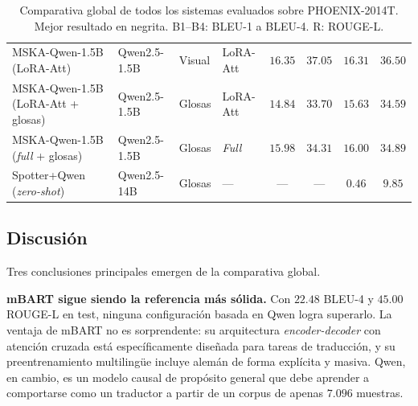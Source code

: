 \begin{table}[H]
{\begin{tabular}{llll|cc|cc}
		MSKA-Qwen-1.5B (LoRA-Att)
		    & Qwen2.5-1.5B & Visual & LoRA-Att
		    & $16.35$ & $37.05$
		    & $16.31$ & $36.50$ \\

		MSKA-Qwen-1.5B (LoRA-Att + glosas)
		    & Qwen2.5-1.5B & Glosas & LoRA-Att
		    & $14.84$ & $33.70$
		    & $15.63$ & $34.59$ \\

		MSKA-Qwen-1.5B (\textit{full} + glosas)
		    & Qwen2.5-1.5B & Glosas & \textit{Full}
		    & $15.98$ & $34.31$
		    & $16.00$ & $34.89$ \\

		Spotter+Qwen (\textit{zero-shot})
		    & Qwen2.5-14B & Glosas & ---
		    & --- & ---
		    & $0.46$ & $9.85$ \\ \hline
	\end{tabular}}
	\caption{Comparativa global de todos los sistemas evaluados sobre
	PHOENIX-2014T\@. Mejor resultado en negrita.
	B1--B4: BLEU-1 a BLEU-4. R: ROUGE-L\@.}
	\label{tab:global}
\end{table}

\subsection{Discusión}

Tres conclusiones principales emergen de la comparativa global.

\textbf{mBART sigue siendo la referencia más sólida.}
Con $22.48$ BLEU-4 y $45.00$ ROUGE-L en test, ninguna configuración basada en Qwen logra superarlo.
La ventaja de mBART no es sorprendente: su arquitectura \textit{encoder-decoder} con atención cruzada está específicamente diseñada para tareas de traducción, y su preentrenamiento multilingüe incluye alemán de forma explícita y masiva.
Qwen, en cambio, es un modelo causal de propósito general que debe aprender a comportarse como un traductor a partir de un corpus de apenas $7.096$ muestras.

